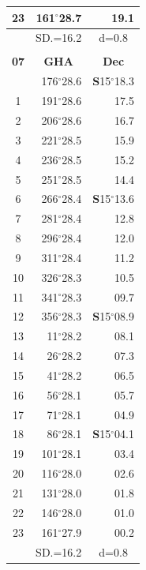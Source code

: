 \documentclass[10pt, a4paper]{report}
\begin{document}
\begin{scriptsize}
\begin{tabular*}{0.2\textwidth}[t]{@{\extracolsep{\fill}}|c|rr|}
23 & 161$^\circ$28.7 & 19.1\\
\hline
\rule{0pt}{2.4ex} & \multicolumn{1}{c}{SD.=16.2} & \multicolumn{1}{c|}{d=0.8}\\
\hline
\multicolumn{1}{c}{}\\[-0.5ex]\hline
\multicolumn{1}{|c|}{\rule{0pt}{2.6ex}\textbf{07}} & \multicolumn{1}{c}{\textbf{GHA}} & \multicolumn{1}{c|}{\textbf{Dec}}\\
\hline\rule{0pt}{2.6ex}\noindent
0 & 176$^\circ$28.6 & \textbf{S}15$^\circ$18.3\\
1 & 191$^\circ$28.6 & 17.5\\
2 & 206$^\circ$28.6 & 16.7\\
3 & 221$^\circ$28.5 & \raisebox{0.24ex}{\boldmath$\cdot$~\boldmath$\cdot$~~}15.9\\
4 & 236$^\circ$28.5 & 15.2\\
5 & 251$^\circ$28.5 & 14.4\\[2Pt]
6 & 266$^\circ$28.4 & \textbf{S}15$^\circ$13.6\\
7 & 281$^\circ$28.4 & 12.8\\
8 & 296$^\circ$28.4 & 12.0\\
9 & 311$^\circ$28.4 & \raisebox{0.24ex}{\boldmath$\cdot$~\boldmath$\cdot$~~}11.2\\
10 & 326$^\circ$28.3 & 10.5\\
11 & 341$^\circ$28.3 & 09.7\\[2Pt]
12 & 356$^\circ$28.3 & \textbf{S}15$^\circ$08.9\\
13 & 11$^\circ$28.2 & 08.1\\
14 & 26$^\circ$28.2 & 07.3\\
15 & 41$^\circ$28.2 & \raisebox{0.24ex}{\boldmath$\cdot$~\boldmath$\cdot$~~}06.5\\
16 & 56$^\circ$28.1 & 05.7\\
17 & 71$^\circ$28.1 & 04.9\\[2Pt]
18 & 86$^\circ$28.1 & \textbf{S}15$^\circ$04.1\\
19 & 101$^\circ$28.1 & 03.4\\
20 & 116$^\circ$28.0 & 02.6\\
21 & 131$^\circ$28.0 & \raisebox{0.24ex}{\boldmath$\cdot$~\boldmath$\cdot$~~}01.8\\
22 & 146$^\circ$28.0 & 01.0\\
23 & 161$^\circ$27.9 & 00.2\\
\hline
\rule{0pt}{2.4ex} & \multicolumn{1}{c}{SD.=16.2} & \multicolumn{1}{c|}{d=0.8}\\
\hline
\end{tabular*}\noindent

\end{scriptsize}
\end{document}
